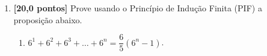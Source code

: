 \documentclass[12pt,a4paper]{article}
\begin{document}
\begin{enumerate}
  \item \textbf{[20,0 pontos]} Prove usando o Princípio de Indução Finita (PIF) a proposição abaixo.
    \begin{enumerate}
      \item $6^1 + 6^2 + 6^3 + \ldots + 6^n = \dfrac{6}{5}\left(6^{n} - 1\right)$.
    \end{enumerate}

\end{enumerate}
\end{document}
